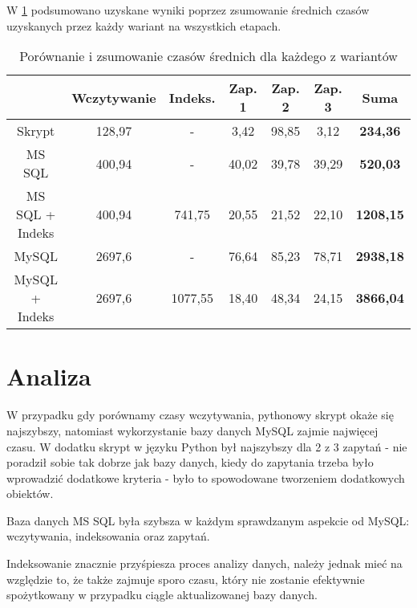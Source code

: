 \documentclass[a4paper,11pt]{article}
\begin{document}
W \ref{tab:summary1} podsumowano uzyskane wyniki poprzez zsumowanie średnich czasów uzyskanych przez każdy wariant na wszystkich etapach.

\begin{table}[h!]
\begin{center}
\caption{Porównanie i zsumowanie czasów średnich dla każdego z wariantów}
\label{tab:summary1}
\begin{tabular}{|c|c|c|c|c|c|c|}
\hline
 & Wczytywanie & Indeks. & Zap. 1 & Zap. 2 & Zap. 3 & \textbf{Suma} \\ \hline
Skrypt & 128,97 & - & 3,42 & 98,85 & 3,12 & \textbf{234,36} \\ \hline
MS SQL & 400,94 & - & 40,02 & 39,78 & 39,29 & \textbf{520,03} \\ \hline
MS SQL + Indeks & 400,94 & 741,75 & 20,55 & 21,52 & 22,10 & \textbf{1208,15} \\ \hline
MySQL & 2697,6 & - & 76,64 & 85,23 & 78,71 & \textbf{2938,18} \\ \hline
MySQL + Indeks & 2697,6 & 1077,55 & 18,40 & 48,34 & 24,15 & \textbf{3866,04} \\ \hline
\end{tabular}
\end{center}
\end{table}

\newpage
\section{Analiza}

W przypadku gdy porównamy czasy wczytywania, pythonowy skrypt okaże się najszybszy, natomiast wykorzystanie bazy danych MySQL zajmie najwięcej czasu. W dodatku skrypt w języku Python był najszybszy dla 2 z 3 zapytań - nie poradził sobie tak dobrze jak bazy danych, kiedy do zapytania trzeba było wprowadzić dodatkowe kryteria - było to spowodowane tworzeniem dodatkowych obiektów.

Baza danych MS SQL była szybsza w każdym sprawdzanym aspekcie od MySQL: wczytywania, indeksowania oraz zapytań. 

Indeksowanie znacznie przyśpiesza proces analizy danych, należy jednak mieć na względzie to, że także zajmuje sporo czasu, który nie zostanie efektywnie spożytkowany w przypadku ciągle aktualizowanej bazy danych.
\end{document}

